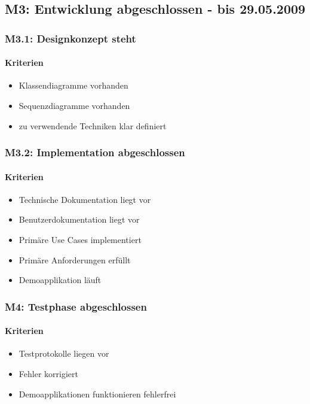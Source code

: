 \subsection{M3: Entwicklung abgeschlossen - bis 29.05.2009}
	
\subsubsection{M3.1: Designkonzept steht}
\paragraph{Kriterien}
\begin{itemize}
	\item Klassendiagramme vorhanden
	\item Sequenzdiagramme vorhanden
	\item zu verwendende Techniken klar definiert
\end{itemize}
\subsubsection{M3.2: Implementation abgeschlossen}
\paragraph{Kriterien}
\begin{itemize}
	\item Technische Dokumentation liegt vor
	\item Benutzerdokumentation liegt vor
	\item Prim\"are Use Cases implementiert 
	\item Prim\"are Anforderungen erf\"ullt
	\item Demoapplikation l\"auft
\end{itemize}
\subsubsection{M4: Testphase abgeschlossen}
\paragraph{Kriterien}
\begin{itemize}
	\item Testprotokolle liegen vor
	\item Fehler korrigiert
	\item Demoapplikationen funktionieren fehlerfrei
\end{itemize}
